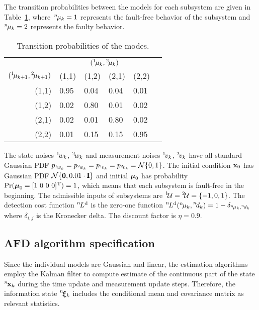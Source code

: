 \documentclass[conference,10pt]{IEEEtran}
\def\ist{\prescript{1\!}{}}
\def\iind{\prescript{2\!}{}}
\def\nth{\prescript{n\!}{}}
\begin{document}
The transition probabilities between the models for each subsystem are given in Table~\ref{tab:modeTran}, where~$\nth{\mu}_k=1$ represents the fault-free behavior of the subsystem and~$\nth{\mu}_k=2$ represents the faulty behavior. 
\begin{table}[ht]
\renewcommand{\arraystretch}{1.2}
\centering 
  \caption{Transition probabilities of the modes.}\label{tab:modeTran}
  \begin{tabular}{rlllll}\toprule
     & \multicolumn{4}{c}{$(\ist{\mu}_{k},\iind{\mu}_{k})$}\\
    \cmidrule{2-5}
    $(\ist{\mu}_{k+1},\iind{\mu}_{k+1})$ & (1,1) &  (1,2) & (2,1) & (2,2)\\\midrule 
    (1,1) & 0.95 & 0.04 & 0.04 & 0.01 \\
    (1,2) & 0.02 & 0.80 & 0.01 & 0.02 \\
    (2,1) & 0.02 & 0.01 & 0.80 & 0.02 \\
    (2,2) & 0.01 & 0.15 & 0.15 & 0.95 \\\bottomrule
  \end{tabular}
\end{table}
The state noises $\ist{w_{k}}$, $\iind{w_{k}}$ and measurement noises $\ist{v_{k}}$, $\iind{v_{k}}$ have all standard Gaussian PDF $p_{\ist{w_{k}}}=p_{\iind{w_{k}}}=p_{\ist{v_{k}}}=p_{\iind{v_{k}}} = \mcN\{0,1\}$. 
The initial condition $\mathbf{x}_{0}$ has Gaussian PDF $\mathcal{N}\{\mathbf{0},0.01\cdot\mathbf{I}\}$ and initial $\boldsymbol{\mu}_{0}$ has probability $\Pr(\boldsymbol{\mu}_{0}=[1\ 0\ 0\ 0]^{\text{T}})=1$, which means that each subsystem is fault-free in
the beginning. 
The admissible inputs of subsystems are $\ist{\mcU}=\iind{\mcU} = \{-1,0,1\}$. 
The detection cost function $\nth{L}^{\mathrm{d}}$ is the zero-one function $\nth{L}^{\mathrm{d}}(\nth{\mu}_{k},\nth{d}_{k}) = 1-\delta_{\nth{\mu}_{k},\nth{d}_{k}}$ where $\delta_{i,j}$ is the Kronecker delta. The discount factor is $\eta=0.9$.

\subsection{AFD algorithm specification}\label{sec:AFDAlgorithmSpecification}
Since the individual models are Gaussian and linear, the estimation algorithms employ the Kalman filter to compute estimate of the continuous part of the state $\nth{\bfx}_k$ during the time update and  measurement update steps. 
Therefore, the information state $\nth{\bfxi}_{k}$ includes the conditional mean and covariance matrix as relevant statistics.
\end{document}
